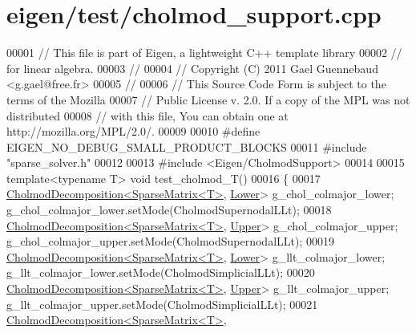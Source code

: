 \hypertarget{eigen_2test_2cholmod__support_8cpp_source}{}\section{eigen/test/cholmod\+\_\+support.cpp}
\label{eigen_2test_2cholmod__support_8cpp_source}

\begin{DoxyCode}
00001 \textcolor{comment}{// This file is part of Eigen, a lightweight C++ template library}
00002 \textcolor{comment}{// for linear algebra.}
00003 \textcolor{comment}{//}
00004 \textcolor{comment}{// Copyright (C) 2011 Gael Guennebaud <g.gael@free.fr>}
00005 \textcolor{comment}{//}
00006 \textcolor{comment}{// This Source Code Form is subject to the terms of the Mozilla}
00007 \textcolor{comment}{// Public License v. 2.0. If a copy of the MPL was not distributed}
00008 \textcolor{comment}{// with this file, You can obtain one at http://mozilla.org/MPL/2.0/.}
00009 
00010 \textcolor{preprocessor}{#define EIGEN\_NO\_DEBUG\_SMALL\_PRODUCT\_BLOCKS}
00011 \textcolor{preprocessor}{#include "sparse\_solver.h"}
00012 
00013 \textcolor{preprocessor}{#include <Eigen/CholmodSupport>}
00014 
00015 \textcolor{keyword}{template}<\textcolor{keyword}{typename} T> \textcolor{keywordtype}{void} test\_cholmod\_T()
00016 \{
00017   \hyperlink{class_eigen_1_1_cholmod_decomposition}{CholmodDecomposition<SparseMatrix<T>}, 
      \hyperlink{group__enums_gga39e3366ff5554d731e7dc8bb642f83cda891792b8ed394f7607ab16dd716f60e6}{Lower}> g\_chol\_colmajor\_lower; g\_chol\_colmajor\_lower.setMode(CholmodSupernodalLLt);
00018   \hyperlink{class_eigen_1_1_cholmod_decomposition}{CholmodDecomposition<SparseMatrix<T>}, 
      \hyperlink{group__enums_gga39e3366ff5554d731e7dc8bb642f83cda6bcb58be3b8b8ec84859ce0c5ac0aaec}{Upper}> g\_chol\_colmajor\_upper; g\_chol\_colmajor\_upper.setMode(CholmodSupernodalLLt);
00019   \hyperlink{class_eigen_1_1_cholmod_decomposition}{CholmodDecomposition<SparseMatrix<T>}, 
      \hyperlink{group__enums_gga39e3366ff5554d731e7dc8bb642f83cda891792b8ed394f7607ab16dd716f60e6}{Lower}> g\_llt\_colmajor\_lower;  g\_llt\_colmajor\_lower.setMode(CholmodSimplicialLLt);
00020   \hyperlink{class_eigen_1_1_cholmod_decomposition}{CholmodDecomposition<SparseMatrix<T>}, 
      \hyperlink{group__enums_gga39e3366ff5554d731e7dc8bb642f83cda6bcb58be3b8b8ec84859ce0c5ac0aaec}{Upper}> g\_llt\_colmajor\_upper;  g\_llt\_colmajor\_upper.setMode(CholmodSimplicialLLt);
00021   \hyperlink{class_eigen_1_1_cholmod_decomposition}{CholmodDecomposition<SparseMatrix<T>}, 

\end{DoxyCode}
